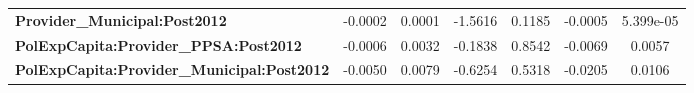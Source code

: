 \begin{center}
\begin{tabular}{lcccccc}
\textbf{Provider\_Municipal:Post2012}              &      -0.0002       &       0.0001       &     -1.5616     &      0.1185      &      -0.0005      &     5.399e-05      \\
\textbf{PolExpCapita:Provider\_PPSA:Post2012}      &      -0.0006       &       0.0032       &     -0.1838     &      0.8542      &      -0.0069      &       0.0057       \\
\textbf{PolExpCapita:Provider\_Municipal:Post2012} &      -0.0050       &       0.0079       &     -0.6254     &      0.5318      &      -0.0205      &       0.0106       \\
\bottomrule
\end{tabular}
\end{center}